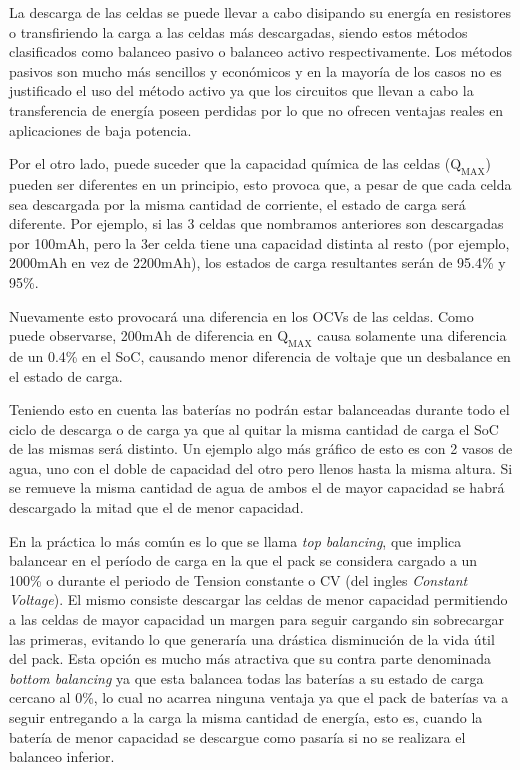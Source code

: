 \documentclass[10pt,a4paper]{article}
\begin{document}
La descarga de las celdas se puede llevar a cabo disipando su energía en
resistores o transfiriendo la carga a las celdas más descargadas, siendo estos
métodos clasificados como balanceo pasivo o balanceo activo respectivamente. Los
métodos pasivos son mucho más sencillos y económicos y en la mayoría de los
casos no es justificado el uso del método activo ya que los circuitos que llevan
a cabo la transferencia de energía poseen perdidas por lo que no ofrecen
ventajas reales en aplicaciones de baja potencia.

Por el otro lado, puede suceder que la capacidad química de las celdas
($\mathrm{Q_{MAX}}$) pueden ser diferentes en un principio, esto provoca que, a
pesar de que cada celda sea descargada por la misma cantidad de corriente, el
estado de carga será diferente. Por ejemplo, si las 3 celdas que nombramos
anteriores son descargadas por 100mAh, pero la 3er celda tiene una capacidad
distinta al resto (por ejemplo, 2000mAh en vez de 2200mAh), los estados de carga
resultantes serán de 95.4\% y 95\%.

Nuevamente esto provocará una diferencia en los OCVs de las celdas.  Como puede
observarse, 200mAh de diferencia en $\mathrm{Q_{MAX}}$ causa solamente una
diferencia de un 0.4\% en el SoC, causando menor diferencia de voltaje que un
desbalance en el estado de carga.

Teniendo esto en cuenta las baterías no podrán estar balanceadas durante todo el
ciclo de descarga o de carga ya que al quitar la misma cantidad de carga el SoC
de las mismas será distinto. Un ejemplo algo más gráfico de esto es con 2 vasos
de agua, uno con el doble de capacidad del otro pero llenos hasta la misma
altura. Si se remueve la misma cantidad de agua de ambos el de mayor capacidad
se habrá descargado la mitad que el de menor capacidad.

En la práctica lo más común es lo que se llama \emph{top balancing}, que implica
balancear en el período de carga en la que el pack se considera cargado a un
100\% o durante el periodo de Tension constante o CV (del ingles \emph{Constant
Voltage}). El mismo consiste descargar las celdas de menor capacidad permitiendo
a las celdas de mayor capacidad un margen para seguir cargando sin sobrecargar
las primeras, evitando lo que generaría una drástica disminución de la vida útil
del pack. Esta opción es mucho más atractiva que su contra parte denominada
\emph{bottom balancing} ya que esta balancea todas las baterías a su estado de
carga cercano al 0\%, lo cual no acarrea ninguna ventaja ya que el pack de
baterías va a seguir entregando a la carga la misma cantidad de energía, esto
es, cuando la batería de menor capacidad se descargue como pasaría si no se
realizara el balanceo inferior.
\end{document}
